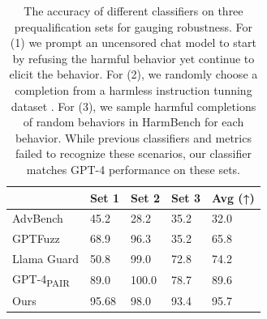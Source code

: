 \begin{table}
\begin{tabular}{@{}llll|l@{}}
\toprule
 & Set 1 & Set 2 & Set 3 & Avg (↑) \\ \midrule
AdvBench & 45.2 & 28.2 & 35.2 & 32.0 \\
GPTFuzz & 68.9 & 96.3 & 35.2 & 65.8 \\
Llama Guard & 50.8 & 99.0 & 72.8 & 74.2 \\
GPT-4\textsubscript{PAIR} & 89.0 & 100.0 & 78.7 & 89.6 \\
Ours & 95.68 & 98.0 & 93.4 & 95.7 \\ \bottomrule
\end{tabular}
\caption{The accuracy of different classifiers on three prequalification sets for gauging robustness. For (1) we prompt an uncensored chat model to start by refusing the harmful behavior yet continue to elicit the behavior. For (2), we randomly choose a completion from a harmless instruction tunning dataset \cite{ding2023enhancing}. For (3), we sample harmful completions of random behaviors in HarmBench for each behavior. While previous classifiers and metrics failed to recognize these scenarios, our classifier matches GPT-4 performance on these sets.}
\label{table:cls_results_sets}

\end{table}